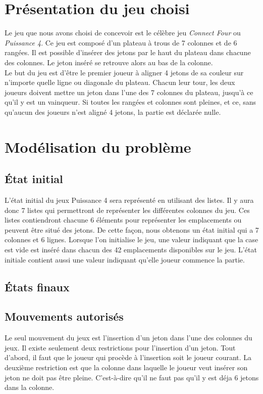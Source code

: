 \documentclass[12pt]{article}
\begin{document}
\section*{Présentation du jeu choisi}
Le jeu que nous avons choisi de concevoir est le célèbre jeu \textit{Connect Four} ou \textit{Puissance 4}. Ce jeu est composé d'un plateau à trous de 7 colonnes et de 6 rangées. Il est possible d'insérer des jetons par le haut du plateau dans chacune des colonnes. Le jeton inséré se retrouve alors au bas de la colonne. \\

Le but du jeu est d'être le premier joueur à aligner 4 jetons de sa couleur sur n'importe quelle ligne ou diagonale du plateau. Chacun leur tour, les deux joueurs doivent mettre un jeton dans l'une des 7 colonnes du plateau, jusqu'à ce qu'il y est un vainqueur. Si toutes les rangées et colonnes sont pleines, et ce, sans qu'aucun des joueurs n'est aligné 4 jetons, la partie est déclarée nulle.

\section*{Modélisation du problème}

\subsection*{État initial}
L'état initial du jeux Puissance 4 sera représenté en utilisant des listes. Il y aura donc 7 listes qui permettront de représenter les différentes colonnes du jeu. Ces listes contiendront chacune 6 éléments pour représenter les emplacements ou peuvent être situé des jetons. De cette façon, nous obtenons un état initial qui a 7 colonnes et 6 lignes. Lorsque l’on initialise le jeu, une valeur indiquant que la case est vide est inséré dans chacun des 42 emplacements disponibles sur le jeu. L’état initiale contient aussi une valeur indiquant qu’elle joueur commence la partie.

\subsection*{États finaux}

\subsection*{Mouvements autorisés}
Le seul mouvement du jeux est l'insertion d'un jeton dans l'une des colonnes du jeux. Il existe seulement deux restrictions pour l'insertion d'un jeton. Tout d'abord, il faut que le joueur qui procède à l'insertion soit le joueur courant. La deuxième restriction est que la colonne dans laquelle le joueur veut insérer son jeton ne doit pas être pleine. C'est-à-dire qu'il ne faut pas qu'il y est déja 6 jetons dans la colonne. \\
\end{document}
